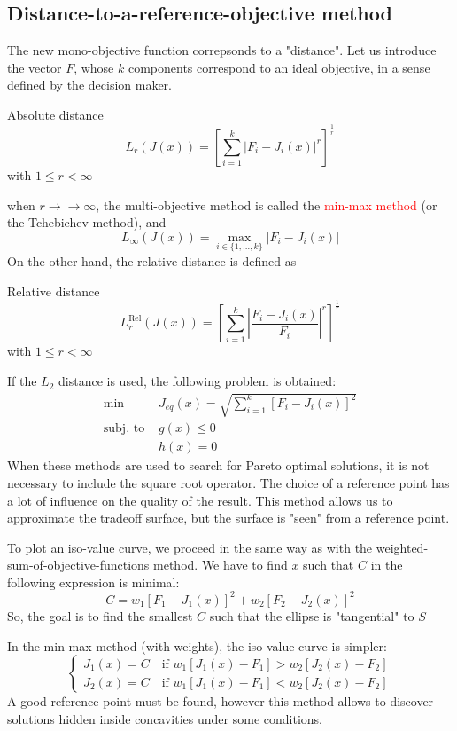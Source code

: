 \documentclass{book}
\begin{document}
\subsection{Distance-to-a-reference-objective method}
The new mono-objective function correpsonds to a "distance". Let us introduce the vector $F$, whose $k$ components correspond to an ideal objective, in a sense defined by the decision maker. 
\begin{Definition}{Absolute distance}{}
    \[
        L_r(J(x)) = \left[\displaystyle\sum_{i=1}^{k}|F_i-J_i(x)|^r\right]^{\displaystyle\frac{1}{r}}
    \]
    with $1\leq r < \infty$
\end{Definition}
when $r\to\to\infty$, the multi-objective method is called the \textcolor{red}{min-max method} (or the Tchebichev method), and 
\[
    L_\infty(J(x)) = \max_{i\in\{1,\dots,k\}}|F_i-J_i(x)|
\]
On the other hand, the relative distance is defined as 
\begin{Definition}{Relative distance}{}
    \[
        L_r^{\text{Rel}}(J(x)) = \left[\displaystyle\sum_{i=1}^{k}\left|\displaystyle\frac{F_i-J_i(x)}{F_i}\right|^r\right]^{\displaystyle\frac{1}{r}}
    \]
    with $1\leq r < \infty$
\end{Definition}
If the $L_2$ distance is used, the following problem is obtained: 
\begin{align*}
    \min & J_{eq}(x) =\sqrt{ \displaystyle\sum_{i=1}^{k}\left[F_i-J_i(x)\right]^2}\\
    \text{subj. to } & g(x)\leq 0 \\ 
    & h(x) = 0
\end{align*}
When these methods are used to search for Pareto optimal solutions, it is not necessary to include the square root operator. The choice of a reference point has a lot of influence on the quality of the result. This method allows us to approximate the tradeoff surface, but the surface is "seen" from a reference point.

To plot an iso-value curve, we proceed in the same way as with the weighted-sum-of-objective-functions method. We have to find $x$ such that $C$ in the following expression is minimal: 
\[
    C = w_1 [F_1-J_1(x)]^2 + w_2[F_2-J_2(x)]^2
\]
So, the goal is to find the smallest $C$ such that the ellipse is "tangential" to $S$

In the min-max method (with weights), the iso-value curve is simpler: 
\[
    \begin{cases}
        J_1(x) = C \quad \text{if } w_1[J_1(x)-F_1]> w_2[J_2(x)-F_2]\\
        J_2(x) = C \quad \text{if } w_1[J_1(x)-F_1]< w_2[J_2(x)-F_2]
    \end{cases}
\]
A good reference point must be found, however this method allows to discover solutions hidden inside concavities under some conditions.
\end{document}
